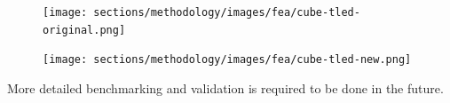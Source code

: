   \begin{figure}
  \begin{minipage}[t]{6cm}
  \begin{center}
  \texttt{[image: sections/methodology/images/fea/cube-tled-original.png]}
  \caption[A soft cube undergoing uniaxial stretch in \cite{Miller2007}]{\label{fea-cube-old}}
  \end{center}
  \end{minipage}
  \hfill
  \begin{minipage}[t]{6cm}
  \begin{center}
  \texttt{[image: sections/methodology/images/fea/cube-tled-new.png]}
  \caption[Results from our implementation of TLED analysis on the same cube.]{\label{fea-cube-new}}
  \end{center}
  \end{minipage}
  \end{figure}

  More detailed benchmarking and validation is required to be done in the future.
